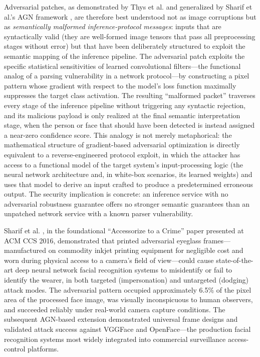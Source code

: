 \documentclass[letterpaper, 10pt, conference]{ieeeconf}
\begin{document}
Adversarial patches, as demonstrated by Thys et al. \cite{thys2019}
and generalized by Sharif et al.'s AGN framework \cite{sharif2019},
are therefore best understood not as image corruptions but as
\textit{semantically malformed inference-protocol messages}: inputs
that are syntactically valid (they are well-formed image tensors that
pass all preprocessing stages without error) but that have been
deliberately structured to exploit the semantic mapping of the
inference pipeline. The adversarial patch exploits the specific
statistical sensitivities of learned convolutional filters---the
functional analog of a parsing vulnerability in a network
protocol---by constructing a pixel pattern whose gradient with respect
to the model's loss function maximally suppresses the target class
activation. The resulting ``malformed packet'' traverses every stage
of the inference pipeline without triggering any syntactic rejection,
and its malicious payload is only realized at the final semantic
interpretation stage, when the person or face that should have been
detected is instead assigned a near-zero confidence score. This
analogy is not merely metaphorical: the mathematical structure of
gradient-based adversarial optimization is directly equivalent to a
reverse-engineered protocol exploit, in which the attacker has
access to a functional model of the target system's input-processing
logic (the neural network architecture and, in white-box scenarios,
its learned weights) and uses that model to derive an input crafted
to produce a predetermined erroneous output. The security implication
is concrete: an inference service with no adversarial robustness
guarantee offers no stronger semantic guarantees than an unpatched
network service with a known parser vulnerability.

Sharif et al. \cite{sharif2016}, in the foundational ``Accessorize
to a Crime'' paper presented at ACM CCS 2016, demonstrated that
printed adversarial eyeglass frames---manufactured on commodity inkjet
printing equipment for negligible cost and worn during physical
access to a camera's field of view---could cause state-of-the-art
deep neural network facial recognition systems to misidentify or fail
to identify the wearer, in both targeted (impersonation) and untargeted
(dodging) attack modes. The adversarial pattern occupied approximately
6.5\% of the pixel area of the processed face image, was visually
inconspicuous to human observers, and succeeded reliably under
real-world camera capture conditions. The subsequent AGN-based
extension \cite{sharif2019} demonstrated universal frame designs
and validated attack success against VGGFace and OpenFace---the
production facial recognition systems most widely integrated into
commercial surveillance access-control platforms.
\end{document}
